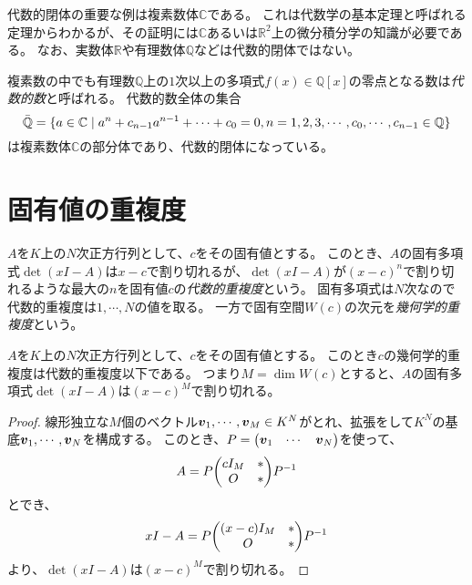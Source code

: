 \begin{example}
代数的閉体の重要な例は複素数体$\mathbb{C}$である。
これは代数学の基本定理と呼ばれる定理からわかるが、その証明には$\mathbb{C}$あるいは$\mathbb{R}^2$上の微分積分学の知識が必要である。
なお、実数体$\mathbb{R}$や有理数体$\mathbb{Q}$などは代数的閉体ではない。
\end{example}

\begin{example}
複素数の中でも有理数$\mathbb{Q}$上の$1$次以上の多項式$f(x) \in \mathbb{Q}[x]$の零点となる数は\emph{代数的数}と呼ばれる。
代数的数全体の集合
$$
\bar{\mathbb{Q}} = \{ a \in \mathbb{C} \mid a^n+c_{n-1}a^{n-1}+\cdots+c_0 = 0, n = 1, 2, 3, \cdots, c_0, \cdots, c_{n-1} \in \mathbb{Q} \}
$$
は複素数体$\mathbb{C}$の部分体であり、代数的閉体になっている。
\end{example}

\section{固有値の重複度}

$A$を$K$上の$N$次正方行列として、$c$をその固有値とする。
このとき、$A$の固有多項式$\det(x I-A)$は$x-c$で割り切れるが、$\det(x I-A)$が$(x-c)^n$で割り切れるような最大の$n$を固有値$c$の\emph{代数的重複度}という。
固有多項式は$N$次なので代数的重複度は$1, \cdots, N$の値を取る。
一方で固有空間$W(c)$の次元を\emph{幾何学的重複度}という。

\begin{proposition}
$A$を$K$上の$N$次正方行列として、$c$をその固有値とする。
このとき$c$の幾何学的重複度は代数的重複度以下である。
つまり$M = \dim W(c)$とすると、$A$の固有多項式$\det(x I-A)$は$(x-c)^M$で割り切れる。
\end{proposition}

\begin{proof}
線形独立な$M$個のベクトル$\vb*{v}_1, \cdots, \vb*{v}_M \in K^N$がとれ、拡張をして$K^N$の基底$\vb*{v}_1, \cdots, \vb*{v}_N$を構成する。
このとき、$P = \mqty(\vb*{v}_1 & \cdots & \vb*{v}_N)$を使って、
$$
A = P\mqty(c I_M & * \\ O & *)P^{-1}
$$
とでき、
$$
x I-A = P\mqty((x-c)I_M & * \\ O & *)P^{-1}
$$
より、$\det(x I-A)$は$(x-c)^M$で割り切れる。
\end{proof}
